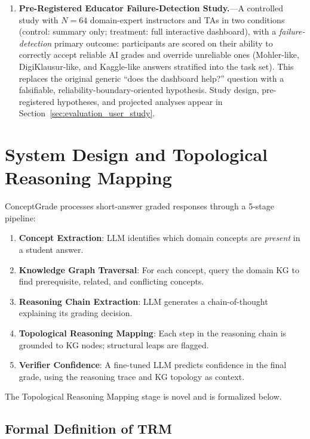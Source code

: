\documentclass[journal,review]{vgtc}
\begin{document}
\begin{enumerate}
  \item \textbf{Pre-Registered Educator Failure-Detection Study.}---A
  controlled study with $N = 64$ domain-expert instructors and TAs in
  two conditions (control: summary only; treatment: full interactive
  dashboard), with a \emph{failure-detection} primary outcome:
  participants are scored on their ability to correctly accept reliable
  AI grades and override unreliable ones (Mohler-like, DigiKlausur-like,
  and Kaggle-like answers stratified into the task set). This replaces
  the original generic ``does the dashboard help?'' question with a
  falsifiable, reliability-boundary-oriented hypothesis. Study design,
  pre-registered hypotheses, and projected analyses appear in
  Section~\ref{sec:evaluation_user_study}.
\end{enumerate}


\section{System Design and Topological Reasoning Mapping} \label{sec:system_design}

ConceptGrade processes short-answer graded responses through a 5-stage pipeline:
\begin{enumerate}
  \item \textbf{Concept Extraction}: LLM identifies which domain concepts are \textit{present} in a student answer.
  \item \textbf{Knowledge Graph Traversal}: For each concept, query the domain KG to find prerequisite, related, and conflicting concepts.
  \item \textbf{Reasoning Chain Extraction}: LLM generates a chain-of-thought explaining its grading decision.
  \item \textbf{Topological Reasoning Mapping}: Each step in the reasoning chain is grounded to KG nodes; structural leaps are flagged.
  \item \textbf{Verifier Confidence}: A fine-tuned LLM predicts confidence in the final grade, using the reasoning trace and KG topology as context.
\end{enumerate}

The Topological Reasoning Mapping stage is novel and is formalized below.

\subsection{Formal Definition of TRM}
\end{document}
